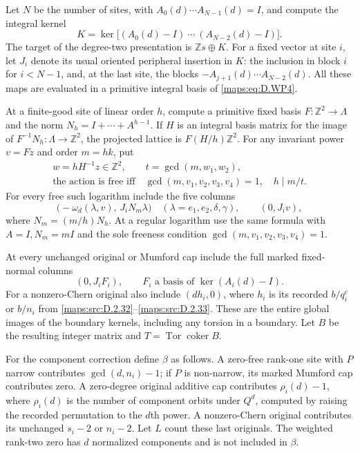 \begin{theorem}
Let $N$ be the number of sites, with
$A_0(d)\cdots A_{N-1}(d)=I$, and compute the integral
kernel
\[
 K=\ker\bigl[(A_0(d)-I)\ \cdots\ (A_{N-2}(d)-I)\bigr].
                                                               \tag{D.WP4}\label{maps:eq:D.WP4}
\]
The target of the degree-two presentation is
$\mathbb Zs\oplus K$. For a fixed vector at site $i$,
let $J_i$ denote its usual oriented peripheral
insertion in $K$: the inclusion in block $i$ for
$i<N-1$, and, at the last site, the blocks
$-A_{j+1}(d)\cdots A_{N-2}(d)$.
All these maps are evaluated in a primitive integral
basis of \eqref{maps:eq:D.WP4}.

At a finite-good site of linear order $h$, compute
a primitive fixed basis $F:\mathbb Z^2\to\Lambda$
and the norm $N_h=I+\cdots+A^{h-1}$. If $H$ is an
integral basis matrix for the image of
$F^{-1}N_h:\Lambda\to\mathbb Z^2$, the projected lattice
is $F(H/h)\mathbb Z^2$. For any invariant power
$v=Fz$ and order $m=hk$, put
\[
 \begin{gathered}
 w=hH^{-1}z\in\mathbb Z^2,\qquad t=\gcd(m,w_1,w_2),\\
 \text{the action is free iff}\quad
 \gcd(m,v_1,v_2,v_3,v_4)=1,\quad h\mid m/t.
 \end{gathered}
                                                               \tag{D.WP5}\label{maps:eq:D.WP5}
\]
For every free such logarithm include the five columns
\[
 \bigl(-\omega_d(\lambda,v),\,J_iN_m\lambda\bigr)
       \quad(\lambda=e_1,e_2,\delta,\gamma),\qquad
                         (0,J_iv),                       \tag{D.WP6}\label{maps:eq:D.WP6}
\]
where $N_m=(m/h)N_h$. At a regular logarithm use the
same formula with $A=I,N_m=mI$ and the sole freeness
condition $\gcd(m,v_1,v_2,v_3,v_4)=1$.

At every unchanged original or Mumford cap include
the full marked fixed-normal columns
\[
                       (0,J_iF_i),\qquad
                   F_i\text{ a basis of }\ker(A_i(d)-I).
                                                               \tag{D.WP7}\label{maps:eq:D.WP7}
\]
For a nonzero-Chern original also include
$(dh_i,0)$, where $h_i$ is its recorded
$b/q_i^c$ or $b/n_i$ from \ref{maps:src:D.2.32}--\ref{maps:src:D.2.33}.
These are the entire global images of the boundary
kernels, including any torsion in a boundary.
Let $B$ be the resulting integer matrix and
$T=\operatorname{Tor}\operatorname{coker}B$.

For the component correction define $\beta$ as follows.
A zero-free rank-one site with $P$ narrow contributes
$\gcd(d,n_i)-1$; if $P$ is non-narrow, its marked
Mumford cap contributes zero. A zero-degree original
additive cap contributes $\rho_i(d)-1$, where
$\rho_i(d)$ is the number of component orbits under
$Q^d$, computed by raising the recorded permutation
to the $d$th power. A nonzero-Chern original contributes
its unchanged $s_i-2$ or $n_i-2$.
Let $L$ count these last originals. The weighted
rank-two zero has $d$ normalized components and is
not included in $\beta$.


\end{theorem}
